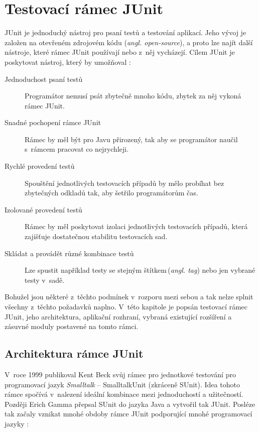 \chapter{Testovací rámec JUnit}                                           %
JUnit je jednoduchý nástroj pro psaní testů a testování aplikací. Jeho vývoj je založen na otevřeném zdrojovém kódu (\emph{angl. open-source}), a proto lze najít další nástroje, které rámec JUnit používají nebo z~něj vycházejí. Cílem JUnit je poskytovat nástroj, který by umožňoval :
\begin{description}
  \item[Jednoduchost psaní testů]
  Programátor nemusí psát zbytečně mnoho kódu, zbytek za něj vykoná rámec JUnit.
  \item[Snadné pochopení rámce JUnit]
  Rámec by měl být pro Javu přirozený, tak aby se programátor naučil s~rámcem pracovat co nejrychleji.
  \item[Rychlé provedení testů]
  Spouštění jednotlivých testovacích případů by mělo probíhat bez zbytečných odkladů tak, aby šetřilo programátorům čas.
  \item[Izolované provedení testů]
  Rámec by měl poskytovat izolaci jednotlivých testovacích případů, která zajišťuje dostatečnou stabilitu testovacích sad.
  \item[Skládat a provádět různé kombinace testů]
  Lze spustit například testy se stejným štítkem\,(\emph{angl. tag}) nebo jen vybrané testy v~sadě.
\end{description}

Bohužel jsou některé z~těchto podmínek v~rozporu mezi sebou a tak nelze splnit všechny z~těchto požadavků naplno. V~této kapitole je popsán testovací rámec JUnit, jeho architektura, aplikační rozhraní, vybraná existující rozšíření a zásuvné moduly postavené na tomto rámci. 


  \section{Architektura rámce JUnit}
  V~roce 1999 publikoval Kent Beck svůj rámec pro jednotkové testování pro programovací jazyk \emph{Smalltalk} -- SmalltalkUnit (zkráceně SUnit). Idea tohoto rámce spočívá v~nalezení ideální kombinace mezi jednoduchostí a užitečností. Později Erich Gamma přepsal SUnit do jazyka Java a vytvořil tak JUnit. Posléze tak začaly vznikat mnohé obdoby rámce JUnit podporující mnohé programovací jazyky \cite{UnitTestFrameworks}:
  
